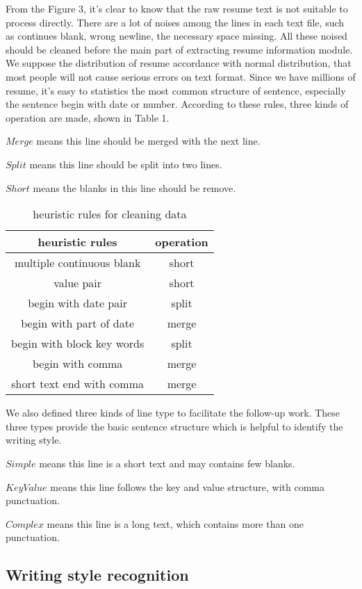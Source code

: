 \documentclass{acm_proc_article-sp}
\begin{document}
From the Figure 3, it's clear to know that the raw resume text is not suitable to process directly. 
There are a lot of noises among the lines in each text file, such as continues blank, wrong newline, the necessary space missing. 
All these noised should be cleaned before the main part of extracting resume information module. 
We suppose the distribution of resume accordance with normal distribution, that most people will not cause serious errors on text format.
Since we have millions of resume, it's easy to statistics the most common structure of sentence, especially the sentence begin with date or number. 
According to these rules, three kinds of operation are made, shown in Table 1.

$Merge$ means this line should be merged with the next line. 

$Split$ means this line should be split into two lines.

$Short$ means the blanks in this line should be remove. 

\begin{table}
\centering
\caption{heuristic rules for cleaning data}
\begin{tabular}{|c|c|} \hline
heuristic rules & operation\\ \hline
multiple continuous blank & short \\ \hline
value pair & short \\ \hline
begin with date pair & split\\ \hline
begin with part of date & merge \\ \hline
begin with block key words & split \\ \hline
begin with comma & merge\\ \hline
short text end with comma & merge \\
\hline\end{tabular}
\end{table}

We also defined three kinds of line type to facilitate the follow-up work. These three types provide the basic sentence structure which is helpful to identify the writing style.

$Simple$ means this line is a short text and may contains few blanks. 

$KeyValue$ means this line follows the key and value structure, with comma punctuation.  

$Complex$ means this line is a long text, which contains more than one punctuation. 

\subsection{Writing style recognition}
\end{document}
